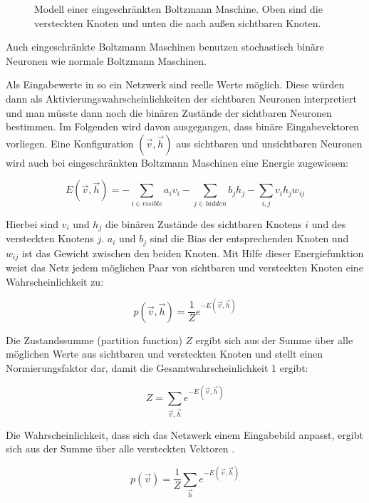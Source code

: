 \documentclass[12pt]{article}
\begin{document}
\begin{figure}[H]
	\center
	
	\caption{Modell einer eingeschränkten Boltzmann Maschine. Oben sind die versteckten Knoten und unten die nach außen sichtbaren Knoten.}
	\label{RBM}
	\end{figure}
	
Auch eingeschränkte Boltzmann Maschinen benutzen stochastisch binäre Neuronen wie normale Boltzmann Maschinen.


Als Eingabewerte in so ein Netzwerk sind reelle Werte möglich. Diese würden dann als Aktivierungswahrscheinlichkeiten der sichtbaren Neuronen interpretiert und man müsste dann noch die binären Zustände der sichtbaren Neuronen bestimmen. Im Folgenden wird davon ausgegangen, dass binäre Eingabevektoren vorliegen. 
Eine Konfiguration $(\vec{v},\vec{h})$ aus sichtbaren und unsichtbaren Neuronen wird auch bei eingeschränkten Boltzmann Maschinen eine Energie zugewiesen:

\begin{equation}
E(\vec{v},\vec{h})= - \sum_{i \in visible} a_iv_i- \sum_{j \in hidden} b_j h_j - \sum_{i,j} v_i h_j w_{ij}
\end{equation}

Hierbei sind $v_i$ und $h_j$ die binären Zustände des sichtbaren Knotens $i$ und des versteckten Knotens $j$. $a_i$ und $b_j$ sind die Bias der entsprechenden Knoten und $w_{ij}$ ist das Gewicht zwischen den beiden Knoten. Mit Hilfe dieser Energiefunktion weist das Netz jedem möglichen Paar von sichtbaren und versteckten Knoten eine Wahrscheinlichkeit zu:

\begin{equation}
p(\vec{v},\vec{h})= \frac{1}{Z} e^{-E(\vec{v},\vec{h})}
\end{equation}

Die Zustandssumme (partition function) $Z$ ergibt sich aus der Summe über alle möglichen Werte aus sichtbaren und versteckten Knoten und stellt einen Normierungsfaktor dar, damit die Gesamtwahrscheinlichkeit 1 ergibt:

\begin{equation}
Z=\sum_{\vec{v},\vec{h}} e^{-E(\vec{v},\vec{h})}
\end{equation}

Die Wahrscheinlichkeit, dass sich das Netzwerk einem Eingabebild anpasst, ergibt sich aus der Summe über alle versteckten Vektoren \cite{guide}.

\begin{equation}
p(\vec{v})= \frac{1}{Z} \sum_{\vec{h}} e^{-E(\vec{v},\vec{h})}
\end{equation}
\end{document}
